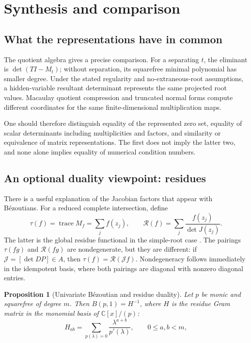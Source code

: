 \documentclass[12pt]{article}
\def\C{\mathbb{C}}
\DeclareMathOperator{\tr}{trace}
\newtheorem{proposition}[theorem]{Proposition}
\theoremstyle{definition}
\theoremstyle{remark}
\begin{document}
\section{Synthesis and comparison}\label{sec:synthesis}

\subsection{What the representations have in common}

The quotient algebra gives a precise comparison. For a separating $t$, the
eliminant is $\det(TI-M_t)$; without separation, its squarefree minimal polynomial
has smaller degree. Under the stated regularity and no-extraneous-root assumptions,
a hidden-variable resultant determinant represents the same projected root values.
Macaulay quotient compression and truncated normal forms compute different
coordinates for the same finite-dimensional multiplication maps.

One should therefore distinguish equality of the represented zero set, equality of
scalar determinants including multiplicities and factors, and similarity or equivalence
of matrix representations. The first does not imply the latter two, and none alone
implies equality of numerical condition numbers.

\subsection{An optional duality viewpoint: residues}\label{sec:residues}

There is a useful explanation of the Jacobian factors that appear with B\'ezoutians.
For a reduced complete intersection, define
\[
  \tau(f)=\tr M_f=\sum_j f(z_j),\qquad
  \mathcal R(f)=\sum_j\frac{f(z_j)}{\det J(z_j)}.
\]
The latter is the global residue functional in the simple-root case
\cite{cattani2005residues}. The pairings $\tau(fg)$ and $\mathcal R(fg)$ are
nondegenerate, but they are different: if $\mathcal J=[\det DP]\in A$, then
$\tau(f)=\mathcal R(\mathcal J f)$. Nondegeneracy follows immediately in the
idempotent basis, where both pairings are diagonal with nonzero diagonal entries.

\begin{proposition}[Univariate B\'ezoutian and residue duality]\label{prop:residue-bezout}
Let $p$ be monic and squarefree of degree $m$. Then $B(p,1)=H^{-1}$, where $H$ is the
residue Gram matrix in the monomial basis of $\C[x]/(p)$:
\[
  H_{ab}=\sum_{p(\lambda)=0}\frac{\lambda^{a+b}}{p'(\lambda)},
  \qquad 0\le a,b<m,
\]
\end{proposition}
\end{document}
